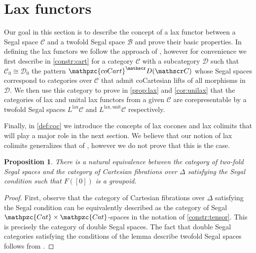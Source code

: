 \documentclass[a4paper, reqno]{amsart}
\newtheorem{prop}[theorem]{Proposition}
\theoremstyle{definition}
\newcommand\cB{\mathscr B}
\newcommand\cC{\mathscr C}
\newcommand\cD{\mathscr D}
\newcommand\ccat{\mathpzc{Cat}}
\newcommand\ccart{\mathpzc{coCart}}
\newcommand\lax{\mathrm{lax}}
\newcommand\un{\mathrm{unit}}
\begin{document}
\section{Lax functors}\label{sect:four}
Our goal in this section is to describe the concept of a lax functor between a Segal space $\cC$ and a twofold Segal space $\cB$ and prove their basic properties. In defining the lax functors we follow the approach of \cite{gaitsgory2017study}, however for convenience we first describe in \cref{constr:cart} for a category $\cC$ with a subcategory $\cD$ such that $\cC_0\cong\cD_0$ the pattern $\ccart^\cD(\cC)$ whose Segal spaces correspond to categories over $\cC$ that admit coCartesian lifts of all morphisms in $\cD$. We then use this category to prove in \cref{prop:lax} and \cref{cor:unilax} that the categories of lax and unital lax functors from a given $\cC$ are corepresentable by a twofold Segal spaces $L^\lax\cC$ and $L^{\lax,\un}\cC$ respectively. \par
Finally, in \cref{def:coc} we introduce the concepts of lax cocones and lax colimits that will play a major role in the next section. We believe that our notion of lax colimits generalizes that of \cite{gepner2015lax}, however we do not prove that this is the case. 
\begin{prop}
There is a natural equivalence between the category of two-fold Segal spaces and the category of Cartesian fibrations over $\Delta$ satisfying the Segal condition such that $F([0])$ is a groupoid.
\end{prop}
\begin{proof}
First, observe that the category of Cartesian fibrations over $\Delta$ satisfying the Segal condition can be equivalently described as the category of Segal $\ccat\times\ccat$-spaces in the notation of \cref{constr:tensor}. This is precisely the category of double Segal spaces. The fact that double Segal categories satisfying the conditions of the lemma describe twofold Segal spaces follows from \cite{haugseng2018equivalence}.
\end{proof}
\end{document}
